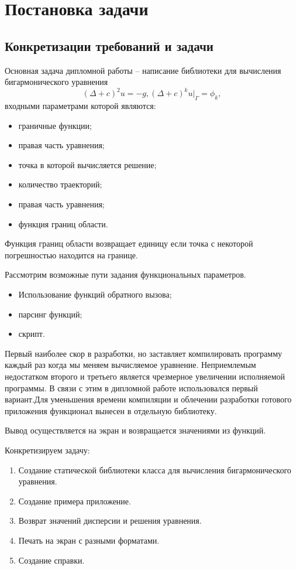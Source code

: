 \chapter{Постановка задачи}
\section{Конкретизации требований и задачи}
Основная задача дипломной работы -- написание библиотеки для вычисления бигармонического уравнения 
\begin{equation}
	 (\Delta +c)^{2}u=-g, (\Delta+c)^{k}u|_{\Gamma}=\phi_{k}, 
\end{equation}
входными параметрами которой являются:
\begin{itemize}
	\item граничные функции;
	\item правая часть уравнения;
	\item точка в которой вычисляется решение;
	\item количество траекторий;
	\item правая часть уравнения;
	\item функция границ области.
\end{itemize}
Функция границ области возвращает единицу если точка с некоторой погрешностью находится на границе. 

Рассмотрим возможные пути задания функциональных параметров.
\begin{itemize}
	\item Использование функций обратного вызова;
	\item парсинг функций;
	\item скрипт.
\end{itemize}
Первый наиболее скор в разработки, но заставляет компилировать программу каждый раз когда мы меняем вычисляемое уравнение. Неприемлемым недостатком второго и третьего является чрезмерное увеличении исполняемой программы. В связи с этим в дипломной работе использовался первый вариант.Для уменьшения времени компиляции и облечении разработки готового приложения функционал вынесен в отдельную библиотеку. 

Вывод осуществляется на экран и возвращается значениями из функций. 

Конкретизируем задачу: 
\begin{enumerate}
	\item Создание статической библиотеки класса для вычисления бигармонического уравнения.
	\item Создание примера приложение.
	\item Возврат значений дисперсии и решения уравнения.
	\item Печать на экран с разными форматами.
	\item Создание справки.
\end{enumerate}
